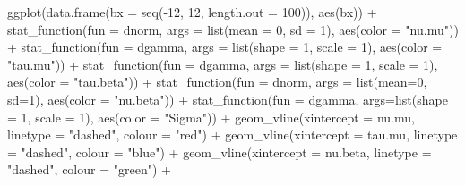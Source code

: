 \documentclass[
]{article}
\newenvironment{Shaded}{\begin{snugshade}}{\end{snugshade}}
\newcommand{\AttributeTok}[1]{\textcolor[rgb]{0.77,0.63,0.00}{#1}}
\newcommand{\DecValTok}[1]{\textcolor[rgb]{0.00,0.00,0.81}{#1}}
\newcommand{\FunctionTok}[1]{\textcolor[rgb]{0.00,0.00,0.00}{#1}}
\newcommand{\NormalTok}[1]{#1}
\newcommand{\SpecialCharTok}[1]{\textcolor[rgb]{0.00,0.00,0.00}{#1}}
\newcommand{\StringTok}[1]{\textcolor[rgb]{0.31,0.60,0.02}{#1}}
\begin{document}
\begin{Shaded}
\begin{Highlighting}[]
\FunctionTok{ggplot}\NormalTok{(}\FunctionTok{data.frame}\NormalTok{(}\AttributeTok{bx =} \FunctionTok{seq}\NormalTok{(}\SpecialCharTok{{-}}\DecValTok{12}\NormalTok{, }\DecValTok{12}\NormalTok{, }\AttributeTok{length.out =} \DecValTok{100}\NormalTok{)), }\FunctionTok{aes}\NormalTok{(bx)) }\SpecialCharTok{+}
  \FunctionTok{stat\_function}\NormalTok{(}\AttributeTok{fun =}\NormalTok{ dnorm, }\AttributeTok{args =} \FunctionTok{list}\NormalTok{(}\AttributeTok{mean =} \DecValTok{0}\NormalTok{, }\AttributeTok{sd =} \DecValTok{1}\NormalTok{), }\FunctionTok{aes}\NormalTok{(}\AttributeTok{color =} \StringTok{"nu.mu"}\NormalTok{)) }\SpecialCharTok{+} 
  \FunctionTok{stat\_function}\NormalTok{(}\AttributeTok{fun =}\NormalTok{ dgamma, }\AttributeTok{args =} \FunctionTok{list}\NormalTok{(}\AttributeTok{shape =} \DecValTok{1}\NormalTok{, }\AttributeTok{scale =} \DecValTok{1}\NormalTok{), }\FunctionTok{aes}\NormalTok{(}\AttributeTok{color =} \StringTok{"tau.mu"}\NormalTok{)) }\SpecialCharTok{+} 
  \FunctionTok{stat\_function}\NormalTok{(}\AttributeTok{fun =}\NormalTok{ dgamma, }\AttributeTok{args =} \FunctionTok{list}\NormalTok{(}\AttributeTok{shape =} \DecValTok{1}\NormalTok{, }\AttributeTok{scale =} \DecValTok{1}\NormalTok{), }\FunctionTok{aes}\NormalTok{(}\AttributeTok{color =} \StringTok{"tau.beta"}\NormalTok{)) }\SpecialCharTok{+} 
  \FunctionTok{stat\_function}\NormalTok{(}\AttributeTok{fun =}\NormalTok{ dnorm, }\AttributeTok{args =} \FunctionTok{list}\NormalTok{(}\AttributeTok{mean=}\DecValTok{0}\NormalTok{, }\AttributeTok{sd=}\DecValTok{1}\NormalTok{), }\FunctionTok{aes}\NormalTok{(}\AttributeTok{color =} \StringTok{"nu.beta"}\NormalTok{)) }\SpecialCharTok{+} 
  \FunctionTok{stat\_function}\NormalTok{(}\AttributeTok{fun =}\NormalTok{ dgamma, }\AttributeTok{args=}\FunctionTok{list}\NormalTok{(}\AttributeTok{shape =} \DecValTok{1}\NormalTok{, }\AttributeTok{scale =} \DecValTok{1}\NormalTok{), }\FunctionTok{aes}\NormalTok{(}\AttributeTok{color =} \StringTok{"Sigma"}\NormalTok{)) }\SpecialCharTok{+}
  \FunctionTok{geom\_vline}\NormalTok{(}\AttributeTok{xintercept =}\NormalTok{ nu.mu, }\AttributeTok{linetype =} \StringTok{"dashed"}\NormalTok{, }\AttributeTok{colour =} \StringTok{"red"}\NormalTok{) }\SpecialCharTok{+}
  \FunctionTok{geom\_vline}\NormalTok{(}\AttributeTok{xintercept =}\NormalTok{ tau.mu, }\AttributeTok{linetype =} \StringTok{"dashed"}\NormalTok{, }\AttributeTok{colour =} \StringTok{"blue"}\NormalTok{) }\SpecialCharTok{+}
  \FunctionTok{geom\_vline}\NormalTok{(}\AttributeTok{xintercept =}\NormalTok{ nu.beta, }\AttributeTok{linetype =} \StringTok{"dashed"}\NormalTok{, }\AttributeTok{colour =} \StringTok{"green"}\NormalTok{) }\SpecialCharTok{+}

\end{Highlighting}
\end{Shaded}
\end{document}
